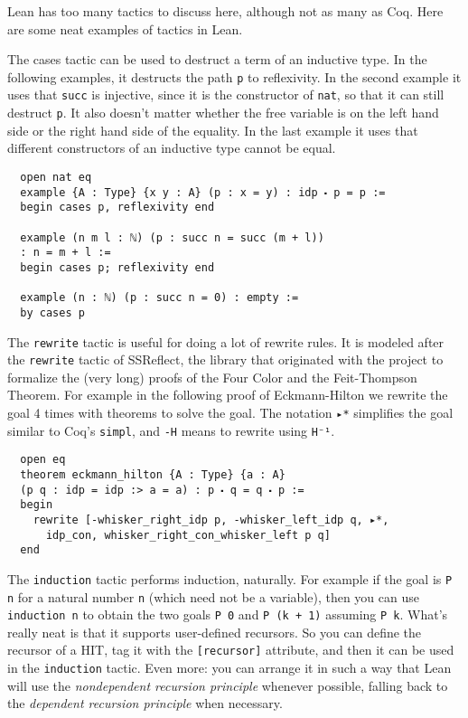 \documentclass[11pt]{amsart}  %
\begin{document}
\begin{enumerate}
Lean has too many tactics to discuss here, although not as many as Coq.
Here are some neat examples of tactics in Lean.

The cases tactic can be used to destruct a term of an inductive type. In the following examples,
it destructs the path \lstinline{p} to reflexivity. In the second example it uses that \lstinline{succ} is
injective, since it is the constructor of \lstinline{nat}, so that it can still destruct \lstinline{p}.
It also doesn't matter whether the free variable is on the left hand side or the right hand
side of the equality. In the last example it uses that different constructors of an inductive type cannot be equal.

\begin{lstlisting}
  open nat eq
  example {A : Type} {x y : A} (p : x = y) : idp ⬝ p = p :=
  begin cases p, reflexivity end
  
  example (n m l : ℕ) (p : succ n = succ (m + l))
  : n = m + l :=
  begin cases p; reflexivity end
  
  example (n : ℕ) (p : succ n = 0) : empty :=
  by cases p
\end{lstlisting}

The \lstinline{rewrite} tactic is useful for doing a lot of rewrite rules.
It is modeled after the \lstinline{rewrite} tactic of SSReflect, the library that originated with
the project to formalize the (very long) proofs of the Four Color and the Feit-Thompson
Theorem. For example in the following proof of Eckmann-Hilton we rewrite the goal 4
times with theorems to solve the goal. The notation \lstinline{▸*} simplifies the goal
similar to Coq's \lstinline{simpl}, and \lstinline{-H} means to rewrite using \lstinline{H⁻¹}.

\begin{lstlisting}
  open eq
  theorem eckmann_hilton {A : Type} {a : A}
  (p q : idp = idp :> a = a) : p ⬝ q = q ⬝ p :=
  begin
    rewrite [-whisker_right_idp p, -whisker_left_idp q, ▸*,
      idp_con, whisker_right_con_whisker_left p q]
  end
\end{lstlisting}

The \lstinline{induction} tactic performs induction, naturally. For example if the goal is \lstinline{P n} for
a natural number \lstinline{n} (which need not be a variable), then you can use \lstinline{induction n} to
obtain the two goals \lstinline{P 0} and \lstinline{P (k + 1)} assuming \lstinline{P k}. What's really neat is
that it supports user-defined recursors. So you can define the recursor of a HIT, tag it
with the \lstinline{[recursor]} attribute, and then it can be used in the \lstinline{induction} tactic.
Even more: you can arrange it in such a way that Lean will use the \emph{nondependent recursion principle}
whenever possible, falling back to the \emph{dependent recursion principle} when necessary.


\end{enumerate}
\end{document}
